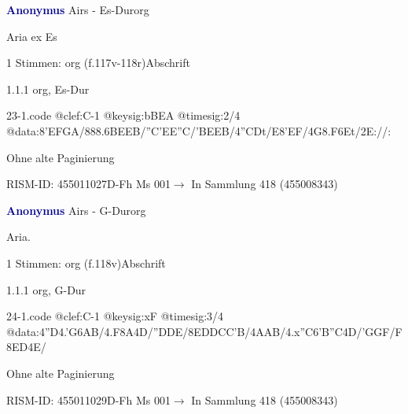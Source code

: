 \documentclass[twocolumn, 12pt]{book}
\begin{document}
\par \vspace{16pt} \textcolor{darkblue}{\textbf{Anonymus  }}\hfillplus{\textbf{[23]}}\newline Airs - Es-Dur\newline org
\par \begin{itshape}[f.117v, heading:] Aria ex Es\end{itshape} 
\par \textcolor{darkblue}{}  1 Stimmen: org  (f.117v-118r)\newline Abschrift
\par 1.1.1  org, Es-Dur  
\begin{filecontents*}{23-1.code}
@clef:C-1
@keysig:bBEA
@timesig:2/4
@data:{8'EF}{GA}/888.6{BE}{EB}/{''C'E}{E''C}/{'BE}{EB}/4''CDt/E{8'EF}/4G{8.F6Et}/2E://:
\end{filecontents*}
\newline %
\par Ohne alte Paginierung
\par RISM-ID: 455011027\newline D-Fh  Ms 001\newline $\rightarrow$ In Sammlung 418 (455008343)
      
\par \vspace{16pt} \textcolor{darkblue}{\textbf{Anonymus  }}\hfillplus{\textbf{[24]}}\newline Airs - G-Dur\newline org
\par \begin{itshape}[f.118v, heading:] Aria.\end{itshape} 
\par \textcolor{darkblue}{}  1 Stimmen: org  (f.118v)\newline Abschrift
\par 1.1.1  org, G-Dur  
\begin{filecontents*}{24-1.code}
@clef:C-1
@keysig:xF
@timesig:3/4
@data:4''D4.'G{6AB}/4.F8A4D/''DDE/{8EDDCC'B}/4AAB/4.x''C{6'B''C}4D/'GGF/F{8ED}4E/
\end{filecontents*}
\newline %
\par Ohne alte Paginierung
\par RISM-ID: 455011029\newline D-Fh  Ms 001\newline $\rightarrow$ In Sammlung 418 (455008343)
      
\end{document}
